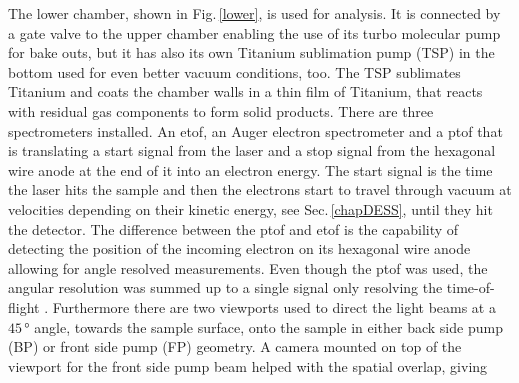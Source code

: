 \documentclass[a4paper,12pt,twoside]{article}
\begin{document}
The lower chamber, shown in Fig.\,\ref{lower}, is used for analysis. It is connected by a gate valve to the upper chamber enabling the use of its turbo molecular pump for bake outs, but it has also its own Titanium sublimation pump (TSP) in the bottom used for even better vacuum conditions, too. The TSP sublimates Titanium and coats the chamber walls in a thin film of Titanium, that reacts with residual gas components to form solid products. There are three spectrometers installed. An \gls{etof}, an Auger electron spectrometer and a \gls{ptof} that is translating a start signal from the laser and a stop signal from the hexagonal wire anode at the end of it into an electron energy. The start signal is the time the laser hits the sample and then the electrons start to travel through vacuum at velocities depending on their kinetic energy, see Sec.\,\ref{chapDESS}, until they hit the detector. The difference between the \gls{ptof} and \gls{etof} is the capability of detecting the position of the incoming electron on its hexagonal wire anode allowing for angle resolved measurements. Even though the \gls{ptof} was used, the angular resolution was summed up to a single signal only resolving the time-of-flight \cite{Kirchmann2008}. Furthermore there are two viewports used to direct the light beams at a $45\,\mathrm{\mbox{°}}$ angle, towards the sample surface, onto the sample in either back side pump (BP) or front side pump (FP) geometry. A camera mounted on top of the viewport for the front side pump beam helped with the spatial overlap, giving\begin{figure}
\end{figure}
\end{document}

